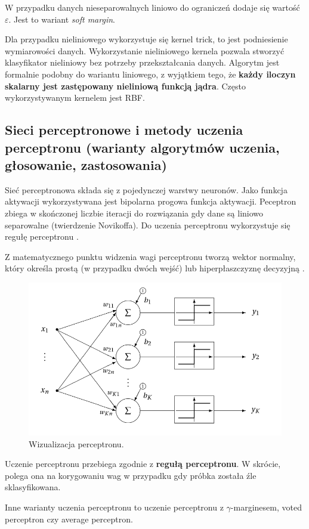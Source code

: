 \documentclass[wi]{zut}
\begin{document}
W przypadku danych nieseparowalnych liniowo do ograniczeń dodaje się wartość $\varepsilon$. Jest to wariant \emph{soft margin}.

Dla przypadku nieliniowego wykorzystuje się kernel trick, to jest podniesienie wymiarowości danych. Wykorzystanie nieliniowego kernela pozwala stworzyć klasyfikator nieliniowy bez potrzeby przekształcania danych. Algorytm jest formalnie podobny do wariantu liniowego, z wyjątkiem tego, że \textbf{każdy iloczyn skalarny jest zastępowany nieliniową funkcją jądra}. Często wykorzystywanym kernelem jest RBF. 

\subsection{Sieci perceptronowe i metody uczenia perceptronu (warianty algorytmów uczenia, głosowanie, zastosowania)}

Sieć perceptronowa składa się z pojedynczej warstwy neuronów. Jako funkcja aktywacji wykorzystywana jest bipolarna progowa funkcja aktywacji. Peceptron zbiega w skończonej liczbie iteracji do rozwiązania gdy dane są liniowo separowalne (twierdzenie Novikoffa). Do uczenia perceptronu wykorzystuje się regułę perceptronu \cite{Korzen2020_8}.

 Z matematycznego punktu widzenia wagi perceptronu tworzą wektor normalny, który określa prostą (w przypadku dwóch wejść) lub hiperpłaszczyznę decyzyjną \cite{wiki:Perceptron}.

\begin{figure}[H]
    \centering
    \includegraphics[width=0.5\linewidth]{images/perceptron.png}
    \caption{Wizualizacja perceptronu.}
    \label{fig:apriori}
\end{figure}

Uczenie perceptronu przebiega zgodnie z \textbf{regułą perceptronu}. W skrócie, polega ona na korygowaniu wag w przypadku gdy próbka została źle sklasyfikowana. 

Inne warianty uczenia perceptronu to uczenie perceptronu z $\gamma$-marginesem, voted perceptron czy average perceptron.
\end{document}
